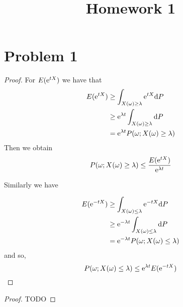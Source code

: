\documentclass{homework}
\title{Homework 1}
\begin{document}
    \maketitle

    \section{Problem 1}
    \begin{subproblem}
        \item
        \begin{proof}
            For $E(\mathrm e^{tX})$ we have that
            \begin{align*}
                E(\mathrm e^{tX})&\geq\int_{X(\omega)\geq\lambda}\mathrm e^{tX}\mathrm d P\\
                &\geq\mathrm e^{\lambda t}\int_{X(\omega)\geq\lambda}\mathrm d P\\
                &=\mathrm e^{\lambda t}P(\omega;X(\omega)\geq\lambda)
            \end{align*}
            Then we obtain
            \[P(\omega;X(\omega)\geq\lambda)\leq\frac{E(\mathrm e^{tX})}{\mathrm e^{\lambda t}}\]

            Similarly we have

            \begin{align*}
                E(\mathrm e^{-tX})&\geq\int_{X(\omega)\leq\lambda}\mathrm e^{-tX}\mathrm d P\\
                &\geq\mathrm e^{-\lambda t}\int_{X(\omega)\leq\lambda}\mathrm d P\\
                &=\mathrm e^{-\lambda t}P(\omega;X(\omega)\leq\lambda)
            \end{align*}
            and so,
            \[P(\omega;X(\omega)\leq\lambda)\leq\mathrm e^{\lambda t}E(\mathrm e^{-tX})\]
        \end{proof}

        \item
        \begin{proof}
            TODO
        \end{proof}
    \end{subproblem}
\end{document}
